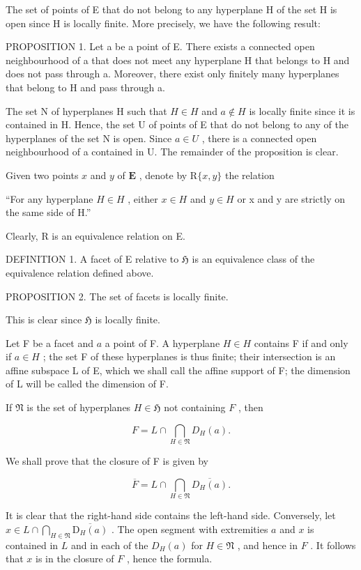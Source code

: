 The set of points of E that do not belong to any hyperplane H of the set H is open since H is locally finite. More precisely, we have the following result:

PROPOSITION 1. Let a be a point of E. There exists a connected open neighbourhood of a that does not meet any hyperplane H that belongs to H and does not pass through a. Moreover, there exist only finitely many hyperplanes that belong to H and pass through a.

The set N of hyperplanes H such that \(H \in H\) and \(a \notin H\) is locally finite since it is contained in H. Hence, the set U of points of E that do not belong to any of the hyperplanes of the set N is open. Since \(a \in U\) , there is a connected open neighbourhood of a contained in U. The remainder of the proposition is clear.

Given two points \(x\) and \(y\) of \(\mathbf{E}\) , denote by \(\mathrm{R}\{x,y\}\) the relation

``For any hyperplane \(H \in H\) , either \(x \in H\) and \(y \in H\) or x and y are strictly on the same side of H.''

Clearly, R is an equivalence relation on E.

DEFINITION 1. A facet of E relative to \(\mathfrak{H}\) is an equivalence class of the equivalence relation defined above.

PROPOSITION 2. The set of facets is locally finite.

This is clear since \(\mathfrak{H}\) is locally finite.

Let F be a facet and \(a\) a point of F. A hyperplane \(H \in H\) contains F if and only if \(a \in H\) ; the set F of these hyperplanes is thus finite; their intersection is an affine subspace L of E, which we shall call the affine support of F; the dimension of L will be called the dimension of F.

If \(\mathfrak{N}\) is the set of hyperplanes \(H\in \mathfrak{H}\) not containing \(F\) , then

\[
F = L \cap \bigcap_ {H \in \mathfrak {N}} D _ {H} (a).\tag{2}
\]

We shall prove that the closure of F is given by

\[
\overline {{F}} = L \cap \bigcap_ {H \in \mathfrak {N}} \overline {{D _ {H} (a)}}.\tag{3}
\]

It is clear that the right-hand side contains the left-hand side. Conversely, let \(x \in L \cap \bigcap_{H \in \mathfrak{N}} \overline{\mathrm{D}_H(a)}\) . The open segment with extremities \(a\) and \(x\) is contained in \(L\) and in each of the \(D_H(a)\) for \(H \in \mathfrak{N}\) , and hence in \(F\) . It follows that \(x\) is in the closure of \(F\) , hence the formula.

